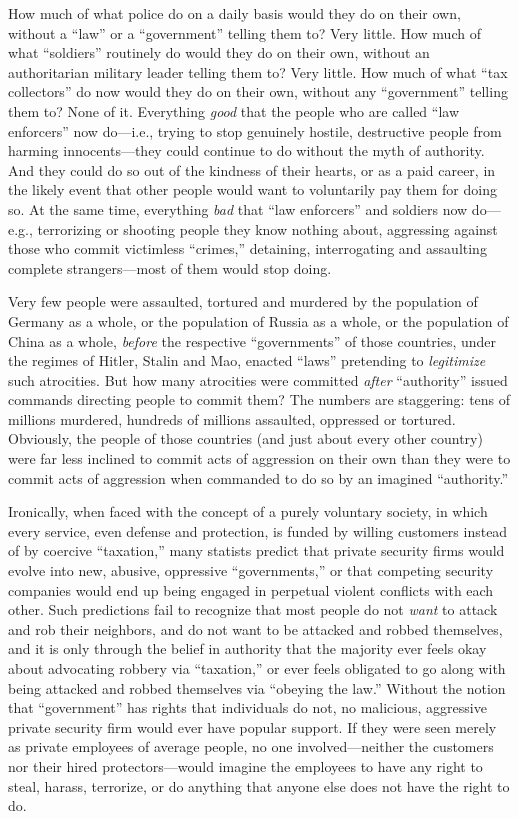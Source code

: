 \documentclass{book}
\begin{document}
How much of what police do on a daily basis would they do on their own, without a \enquote{law} or a \enquote{government} telling them to? Very little. How much of what \enquote{soldiers} routinely do would they do on their own, without an authoritarian military leader telling them to? Very little. How much of what \enquote{tax collectors} do now would they do on their own, without any \enquote{government} telling them to? None of it. Everything \emph{good} that the people who are called \enquote{law enforcers} now do---i.e., trying to stop genuinely hostile, destructive people from harming innocents---they could continue to do without the myth of authority. And they could do so out of the kindness of their hearts, or as a paid career, in the likely event that other people would want to voluntarily pay them for doing so. At the same time, everything \emph{bad} that \enquote{law enforcers} and soldiers now do---e.g., terrorizing or shooting people they know nothing about, aggressing against those who commit victimless \enquote{crimes,} detaining, interrogating and assaulting complete strangers---most of them would stop doing.

Very few people were assaulted, tortured and murdered by the population of Germany as a whole, or the population of Russia as a whole, or the population of China as a whole, \emph{before} the respective \enquote{governments} of those countries, under the regimes of Hitler, Stalin and Mao, enacted \enquote{laws} pretending to \emph{legitimize} such atrocities. But how many atrocities were committed \emph{after} \enquote{authority} issued commands directing people to commit them? The numbers are staggering: tens of millions murdered, hundreds of millions assaulted, oppressed or tortured. Obviously, the people of those countries (and just about every other country) were far less inclined to commit acts of aggression on their own than they were to commit acts of aggression when commanded to do so by an imagined \enquote{authority.}

Ironically, when faced with the concept of a purely voluntary society, in which every service, even defense and protection, is funded by willing customers instead of by coercive \enquote{taxation,} many statists predict that private security firms would evolve into new, abusive, oppressive \enquote{governments,} or that competing security companies would end up being engaged in perpetual violent conflicts with each other. Such predictions fail to recognize that most people do not \emph{want} to attack and rob their neighbors, and do not want to be attacked and robbed themselves, and it is only through the belief in authority that the majority ever feels okay about advocating robbery via \enquote{taxation,} or ever feels obligated to go along with being attacked and robbed themselves via \enquote{obeying the law.} Without the notion that \enquote{government} has rights that individuals do not, no malicious, aggressive private security firm would ever have popular support. If they were seen merely as private employees of average people, no one involved---neither the customers nor their hired protectors---would imagine the employees to have any right to steal, harass, terrorize, or do anything that anyone else does not have the right to do.
\end{document}

